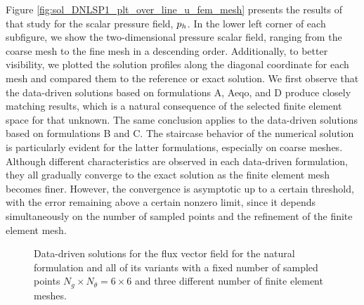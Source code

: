 Figure \ref{fig:sol_DNLSP1_plt_over_line_u_fem_mesh} presents the results of that study for the scalar pressure field, \( p_h \). In the lower left corner of each subfigure, we show the two-dimensional pressure scalar field, ranging from the coarse mesh to the fine mesh in a descending order. Additionally, to better visibility, we plotted the solution profiles along the diagonal coordinate for each mesh and compared them to the reference or exact solution.  We first observe that the data-driven solutions based on formulations A, Aeqo, and D produce closely matching results, which is a natural consequence of the selected finite element space for that unknown. The same conclusion applies to the data-driven solutions based on formulations B and C. The staircase behavior of the numerical solution is particularly evident for the latter formulations, especially on coarse meshes. Although different characteristics are observed in each data-driven formulation, they all gradually converge to the exact solution as the finite element mesh becomes finer. However, the convergence is asymptotic up to a certain threshold, with the error remaining above a certain nonzero limit, since it depends simultaneously on the number of sampled points and the refinement of the finite element mesh.




\begin{figure}[h!]
	\centering
	\caption{Data-driven solutions for the flux vector field for the natural formulation and all of its variants with a fixed number of sampled points $ N_{g} \times N_{\theta} = 6 \times 6 $ and three different number of finite element meshes. }
	\def\svgwidth{\columnwidth}
	
	\label{fig:sol_DNLSP1_plt_over_line_s_fem_mesh}
\end{figure}



